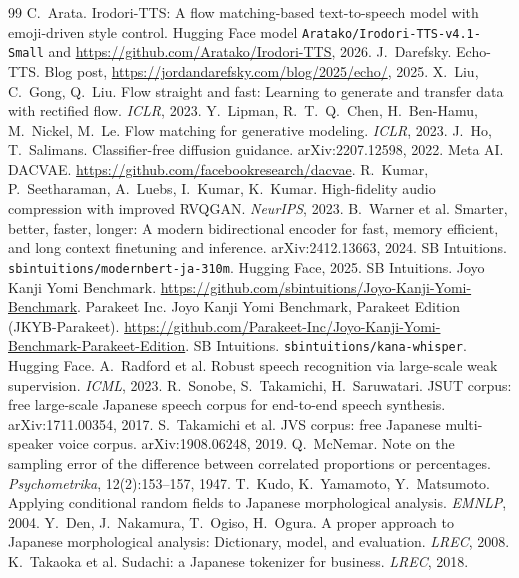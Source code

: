 \documentclass[10pt,a4paper,twocolumn]{article}
\begin{document}
\begin{thebibliography}{99}\footnotesize
\setlength{\itemsep}{0pt}
 C.~Arata. Irodori-TTS: A flow matching-based text-to-speech model with
emoji-driven style control. Hugging Face model \texttt{Aratako/Irodori-TTS-v4.1-Small} and
\url{https://github.com/Aratako/Irodori-TTS}, 2026.
 J.~Darefsky. Echo-TTS. Blog post,
\url{https://jordandarefsky.com/blog/2025/echo/}, 2025.
 X.~Liu, C.~Gong, Q.~Liu. Flow straight and fast: Learning to generate and transfer
data with rectified flow. \emph{ICLR}, 2023.
 Y.~Lipman, R.~T.~Q.~Chen, H.~Ben-Hamu, M.~Nickel, M.~Le. Flow matching for
generative modeling. \emph{ICLR}, 2023.
 J.~Ho, T.~Salimans. Classifier-free diffusion guidance. arXiv:2207.12598, 2022.
 Meta AI. DACVAE. \url{https://github.com/facebookresearch/dacvae}.
 R.~Kumar, P.~Seetharaman, A.~Luebs, I.~Kumar, K.~Kumar. High-fidelity audio
compression with improved RVQGAN. \emph{NeurIPS}, 2023.
 B.~Warner et al. Smarter, better, faster, longer: A modern bidirectional
encoder for fast, memory efficient, and long context finetuning and inference.
arXiv:2412.13663, 2024.
 SB Intuitions. \texttt{sbintuitions/modernbert-ja-310m}. Hugging Face,
2025.
 SB Intuitions. Joyo Kanji Yomi Benchmark.
\url{https://github.com/sbintuitions/Joyo-Kanji-Yomi-Benchmark}.
 Parakeet Inc. Joyo Kanji Yomi Benchmark, Parakeet Edition (JKYB-Parakeet).
\url{https://github.com/Parakeet-Inc/Joyo-Kanji-Yomi-Benchmark-Parakeet-Edition}.
 SB Intuitions. \texttt{sbintuitions/kana-whisper}. Hugging Face.
 A.~Radford et al. Robust speech recognition via large-scale weak supervision.
\emph{ICML}, 2023.
 R.~Sonobe, S.~Takamichi, H.~Saruwatari. JSUT corpus: free large-scale Japanese
speech corpus for end-to-end speech synthesis. arXiv:1711.00354, 2017.
 S.~Takamichi et al. JVS corpus: free Japanese multi-speaker voice corpus.
arXiv:1908.06248, 2019.
 Q.~McNemar. Note on the sampling error of the difference between correlated
proportions or percentages. \emph{Psychometrika}, 12(2):153--157, 1947.
 T.~Kudo, K.~Yamamoto, Y.~Matsumoto. Applying conditional random fields to
Japanese morphological analysis. \emph{EMNLP}, 2004.
 Y.~Den, J.~Nakamura, T.~Ogiso, H.~Ogura. A proper approach to Japanese
morphological analysis: Dictionary, model, and evaluation. \emph{LREC}, 2008.
 K.~Takaoka et al. Sudachi: a Japanese tokenizer for business. \emph{LREC}, 2018.

\end{thebibliography}
\end{document}
